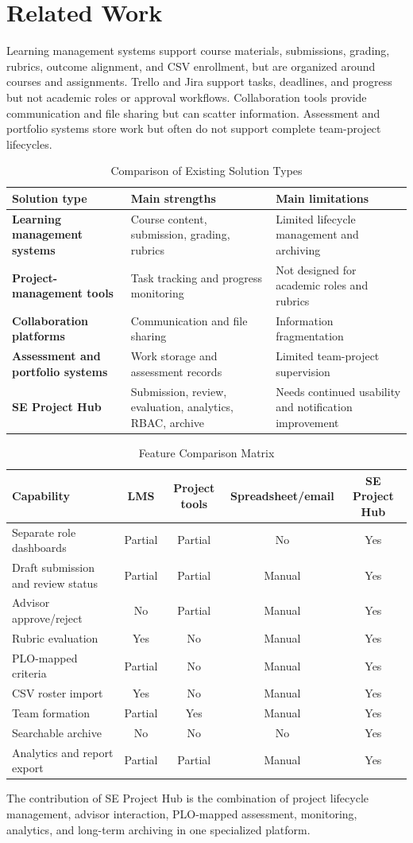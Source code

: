 \documentclass[12pt,a4paper]{report}
\begin{document}
\section{Related Work}
Learning management systems support course materials, submissions, grading, rubrics, outcome alignment, and CSV enrollment, but are organized around courses and assignments. Trello and Jira support tasks, deadlines, and progress but not academic roles or approval workflows. Collaboration tools provide communication and file sharing but can scatter information. Assessment and portfolio systems store work but often do not support complete team-project lifecycles.
\begin{table}[H]\centering\caption{Comparison of Existing Solution Types}\begin{tabularx}{\textwidth}{>{\bfseries}p{}XX}\toprule Solution type&Main strengths&Main limitations\\\midrule Learning management systems&Course content, submission, grading, rubrics&Limited lifecycle management and archiving\\Project-management tools&Task tracking and progress monitoring&Not designed for academic roles and rubrics\\Collaboration platforms&Communication and file sharing&Information fragmentation\\Assessment and portfolio systems&Work storage and assessment records&Limited team-project supervision\\SE Project Hub&Submission, review, evaluation, analytics, RBAC, archive&Needs continued usability and notification improvement\\\bottomrule\end{tabularx}\end{table}
\clearpage\begin{table}[H]\centering\caption{Feature Comparison Matrix}\scriptsize\begin{tabularx}{\textwidth}{Xcccc}\toprule Capability&LMS&Project tools&Spreadsheet/email&SE Project Hub\\\midrule Separate role dashboards&Partial&Partial&No&Yes\\Draft submission and review status&Partial&Partial&Manual&Yes\\Advisor approve/reject&No&Partial&Manual&Yes\\Rubric evaluation&Yes&No&Manual&Yes\\PLO-mapped criteria&Partial&No&Manual&Yes\\CSV roster import&Yes&No&Manual&Yes\\Team formation&Partial&Yes&Manual&Yes\\Searchable archive&No&No&No&Yes\\Analytics and report export&Partial&Partial&Manual&Yes\\\bottomrule\end{tabularx}\end{table}
The contribution of SE Project Hub is the combination of project lifecycle management, advisor interaction, PLO-mapped assessment, monitoring, analytics, and long-term archiving in one specialized platform.
\end{document}
